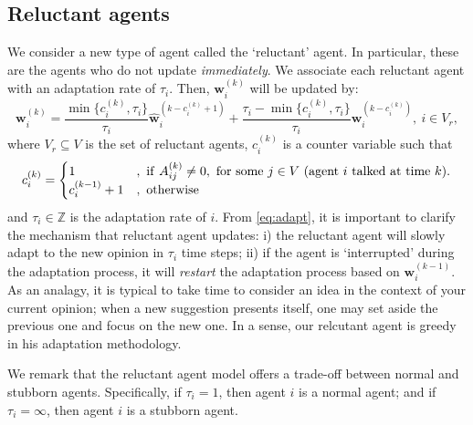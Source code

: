 \documentclass[letter]{article}
\theoremstyle{remark}
\begin{document}
\subsection{Reluctant agents}
We consider a new type of agent called the `reluctant' agent. In particular, these are the agents who do not update \emph{immediately}. We associate each reluctant agent with an adaptation rate of $\tau_i$. Then, ${\bm w}_i^{(k)}$ will be updated by:
\begin{equation} \label{eq:adapt}
{\bm w}_i^{(k)} = \frac{\min\{ c_i^{(k)}, \tau_i\} }{\tau_i} \hat{\bm w}_i^{(k - c_i^{(k)} + 1)} + \frac{\tau_i - \min\{ c_i^{(k)}, \tau_i\} }{\tau_i} {\bm w}_i^{(k-c_i^{(k)})},~i \in V_r,
\end{equation}
where $V_r \subseteq V$ is the set of reluctant agents, $c_i^{(k)}$ is a counter variable such that
\[
c_i^{(k)} = \begin{cases}
1 &,~{\rm if}~A_{ij}^{(k)} \neq 0,~\text{for some}~j \in V~\text{(agent $i$ talked at time $k$)}. \\
c_i^{(k-1)} + 1 &,~{\rm otherwise}
\end{cases}
\]
and $\tau_i \in \mathbb{Z}$ is the adaptation rate of $i$. From \eqref{eq:adapt}, it is important to clarify the mechanism that reluctant agent updates: i) the reluctant agent will slowly adapt to the new opinion in $\tau_i$ time steps; ii) if the agent is `interrupted' during the adaptation process, it will \emph{restart} the adaptation process based on ${\bm w}_i^{(k-1)}$. As an analagy, it is typical to take time to consider an idea in the context of your current opinion; when a new suggestion presents itself, one may set aside the previous one and focus on the new one. In a sense, our relcutant agent is greedy in his adaptation methodology.

We remark that the reluctant agent model offers a trade-off between normal and stubborn agents. Specifically, if $\tau_i = 1$, then agent $i$ is a normal agent; and if $\tau_i = \infty$, then agent $i$ is a stubborn agent. 


\end{document}
